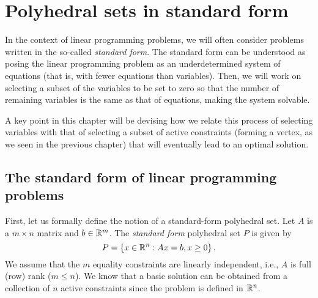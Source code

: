 \section{Polyhedral sets in standard form}

In the context of linear programming problems, we will often consider problems written in the so-called \emph{standard form}. The standard form can be understood as posing the linear programming problem as an underdetermined system of equations (that is, with fewer equations than variables). Then, we will work on selecting a subset of the variables to be set to zero so that the number of remaining variables is the same as that of equations, making the system solvable. 

A key point in this chapter will be devising how we relate this process of selecting variables with that of selecting a subset of active constraints (forming a vertex, as we seen in the previous chapter) that will eventually lead to an optimal solution. 


\subsection{The standard form of linear programming problems}

First, let us formally define the notion of a standard-form polyhedral set. Let $A$ is a $m \times n$ matrix and $b \in \mathbb{R}^m$. The \emph{standard form} polyhedral set $P$ is given by 
%
\begin{equation*}
	P = \left\{ x \in \mathbb{R}^n : Ax = b, x \geq 0 \right \}.		
\end{equation*}
%
We assume that the $m$ equality constraints are linearly independent, i.e., $A$ is full (row) rank ($m \leq n$). We know that a basic solution can be obtained from a collection of $n$ active constraints since the problem is defined in $\mathbb{R}^n$. 


